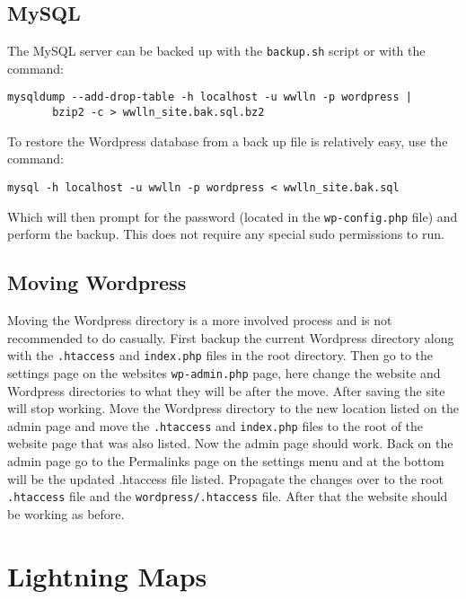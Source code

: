 \subsection{MySQL}

The MySQL server can be backed up with the \texttt{backup.sh} script or with the command:

\begin{verbatim}
mysqldump --add-drop-table -h localhost -u wwlln -p wordpress | 
       bzip2 -c > wwlln_site.bak.sql.bz2
\end{verbatim}

To restore the Wordpress database from a back up file is relatively easy, use the command:

\begin{verbatim}
mysql -h localhost -u wwlln -p wordpress < wwlln_site.bak.sql
\end{verbatim}

Which will then prompt for the password (located in the \texttt{wp-config.php} file) and perform the backup.
This does not require any special sudo permissions to run.

\subsection{Moving Wordpress}

Moving the Wordpress directory is a more involved process and is not recommended to do casually.
First backup the current Wordpress directory along with the \texttt{.htaccess} and \texttt{index.php} files in the root directory.
Then go to the settings page on the websites \texttt{wp-admin.php} page, here change the website and Wordpress directories to what they will be after the move.
After saving the site will stop working.
Move the Wordpress directory to the new location listed on the admin page and move the \texttt{.htaccess} and \texttt{index.php} files to the root of the website page that was also listed.
Now the admin page should work.
Back on the admin page go to the Permalinks page on the settings menu and at the bottom will be the updated .htaccess file listed.
Propagate the changes over to the root \texttt{.htaccess} file and the \texttt{wordpress/.htaccess} file.
After that the website should be working as before.

\section{Lightning Maps}

